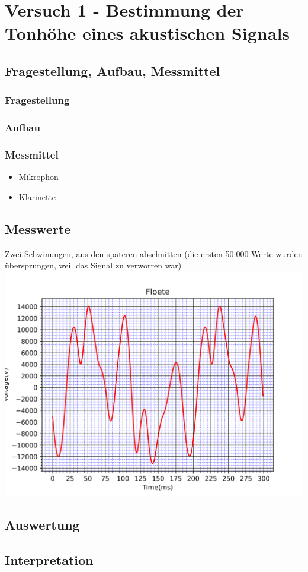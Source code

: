 \chapter{Versuch 1 - Bestimmung der Tonhöhe eines akustischen Signals}
\label{chap:VERSUCH_1}


\section{Fragestellung, Aufbau, Messmittel}
\label{chap:VERSUCH_1_FRAGESTELLUNG}

\subsection*{Fragestellung}


\subsection*{Aufbau}



\subsection*{Messmittel}
\begin{itemize}
	\item Mikrophon
	\item Klarinette
\end{itemize}

\section{Messwerte}
\label{chap:VERSUCH_1_MESSWERTE}



Zwei Schwinungen, aus den späteren abschnitten (die ersten 50.000 Werte wurden übersprungen, weil das Signal zu verworren war)
\includegraphics[scale=0.75]{media/Signal_Raster}

\section{Auswertung}
\label{chap:VERSUCH_1_AUSWERTUNG}



\section{Interpretation}
\label{chap:VERSUCH_1_INTERPRETATION}